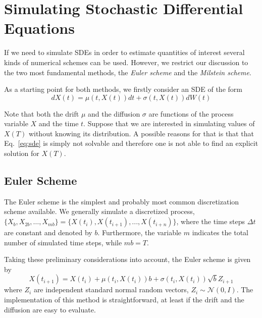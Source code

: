 \section {Simulating Stochastic Differential Equations}
If we need to simulate SDEs in order to estimate quantities of interest several kinds of numerical schemes can be used. However, we restrict our discussion to the two most fundamental methods, the \emph{Euler scheme} and the \emph{Milstein scheme}. 

As a starting point for both methods, we firstly consider an SDE of the form
\begin{equation}
dX(t) = \mu(t, X(t))dt + \sigma(t, X(t)) dW (t)
\label{eq:sde}
\end{equation}

Note that both the drift $\mu$ and the diffusion $\sigma$ are functions of the process variable $X$ and the time $t$. Suppose that we are interested in simulating values of $X(T)$ without knowing its distribution. A possible reasons for that is that that Eq.~\ref{eq:sde} is simply not solvable and therefore one is not able to find an explicit solution for $X(T)$.


\subsection{Euler Scheme}
The Euler scheme is the simplest and probably most common discretization scheme available. We generally simulate a discretized process, $\{X_b, X_{2b},\ldots, X_{mb}\} = \{X(t_i), X(t_{i+1}),...,X(t_{i+n})\}$, where the time steps $\Delta t$ are constant and denoted by $b$. Furthermore, the variable $m$ indicates the total number of simulated time steps, while $mb = T$.

Taking these preliminary considerations into account, the Euler scheme is given by
\begin{equation}
X(t_{i+1}) = X(t_i) + \mu(t_i , X(t_i))b + \sigma(t_i , X(t_i))\sqrt{b}Z_{i+1}
\label{eq:euler_scheme}
\end{equation}
where $Z_i$ are independent standard normal random vectors, $Z_i ∼ \mathcal{N}(0,I)$. 
The implementation of this method is straightforward, at least if the drift and the diffusion are easy to evaluate.


